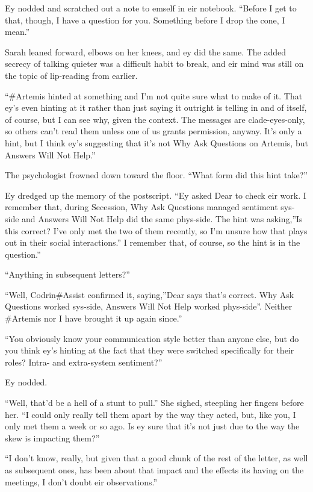 Ey nodded and scratched out a note to emself in eir notebook. ``Before I get to that, though, I have a question for you. Something before I drop the cone, I mean.''

Sarah leaned forward, elbows on her knees, and ey did the same. The added secrecy of talking quieter was a difficult habit to break, and eir mind was still on the topic of lip-reading from earlier.

``\#Artemis hinted at something and I'm not quite sure what to make of it. That ey's even hinting at it rather than just saying it outright is telling in and of itself, of course, but I can see why, given the context. The messages are clade-eyes-only, so others can't read them unless one of us grants permission, anyway. It's only a hint, but I think ey's suggesting that it's not Why Ask Questions on Artemis, but Answers Will Not Help.''

The psychologist frowned down toward the floor. ``What form did this hint take?''

Ey dredged up the memory of the postscript. ``Ey asked Dear to check eir work. I remember that, during Secession, Why Ask Questions managed sentiment sys-side and Answers Will Not Help did the same phys-side. The hint was asking,''Is this correct? I've only met the two of them recently, so I'm unsure how that plays out in their social interactions.'' I remember that, of course, so the hint is in the question.''

``Anything in subsequent letters?''

``Well, Codrin\#Assist confirmed it, saying,''Dear says that's correct. Why Ask Questions worked sys-side, Answers Will Not Help worked phys-side''. Neither \#Artemis nor I have brought it up again since.''

``You obviously know your communication style better than anyone else, but do you think ey's hinting at the fact that they were switched specifically for their roles? Intra- and extra-system sentiment?''

Ey nodded.

``Well, that'd be a hell of a stunt to pull.'' She sighed, steepling her fingers before her. ``I could only really tell them apart by the way they acted, but, like you, I only met them a week or so ago. Is ey sure that it's not just due to the way the skew is impacting them?''

``I don't know, really, but given that a good chunk of the rest of the letter, as well as subsequent ones, has been about that impact and the effects its having on the meetings, I don't doubt eir observations.''

